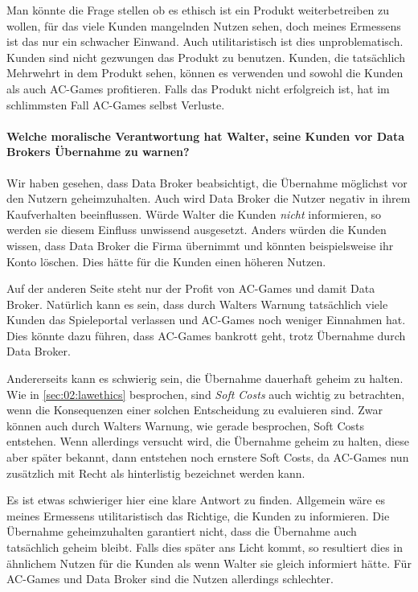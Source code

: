 Man könnte die Frage stellen ob es ethisch ist ein Produkt weiterbetreiben zu wollen, für das viele Kunden mangelnden Nutzen sehen, doch meines Ermessens ist das nur ein schwacher Einwand. 
Auch utilitaristisch ist dies unproblematisch. Kunden sind nicht gezwungen das Produkt zu benutzen.
Kunden, die tatsächlich Mehrwehrt in dem Produkt sehen, können es verwenden und sowohl die Kunden als auch AC-Games profitieren.
Falls das Produkt nicht erfolgreich ist, hat im schlimmsten Fall AC-Games selbst Verluste.

\paragraph*{Welche moralische Verantwortung hat Walter, seine Kunden vor Data Brokers Übernahme zu warnen?\cite*{kees_faites_2017}}

Wir haben gesehen, dass Data Broker beabsichtigt, die Übernahme möglichst vor den Nutzern geheimzuhalten.
Auch wird Data Broker die Nutzer negativ in ihrem Kaufverhalten beeinflussen.
Würde Walter die Kunden \emph{nicht} informieren, so werden sie diesem Einfluss unwissend ausgesetzt.
Anders würden die Kunden wissen, dass Data Broker die Firma übernimmt und könnten beispielsweise ihr Konto löschen.
Dies hätte für die Kunden einen höheren Nutzen.

Auf der anderen Seite steht nur der Profit von AC-Games und damit Data Broker.
Natürlich kann es sein, dass durch Walters Warnung tatsächlich viele Kunden das Spieleportal verlassen und AC-Games noch weniger Einnahmen hat.
Dies könnte dazu führen, dass AC-Games bankrott geht, trotz Übernahme durch Data Broker.

Andererseits kann es schwierig sein, die Übernahme dauerhaft geheim zu halten.
Wie in \cref{sec:02:lawethics} besprochen, sind \emph{Soft Costs} auch wichtig zu betrachten, wenn die Konsequenzen einer solchen Entscheidung zu evaluieren sind.
Zwar können auch durch Walters Warnung, wie gerade besprochen, Soft Costs entstehen.
Wenn allerdings versucht wird, die Übernahme geheim zu halten, diese aber später bekannt, dann entstehen noch ernstere Soft Costs, da AC-Games nun zusätzlich mit Recht als hinterlistig bezeichnet werden kann.

Es ist etwas schwieriger hier eine klare Antwort zu finden. 
Allgemein wäre es meines Ermessens utilitaristisch das Richtige, die Kunden zu informieren.
Die Übernahme geheimzuhalten garantiert nicht, dass die Übernahme auch tatsächlich geheim bleibt.
Falls dies später ans Licht kommt, so resultiert dies in ähnlichem Nutzen für die Kunden als wenn Walter sie gleich informiert hätte.
Für AC-Games und Data Broker sind die Nutzen allerdings schlechter.

